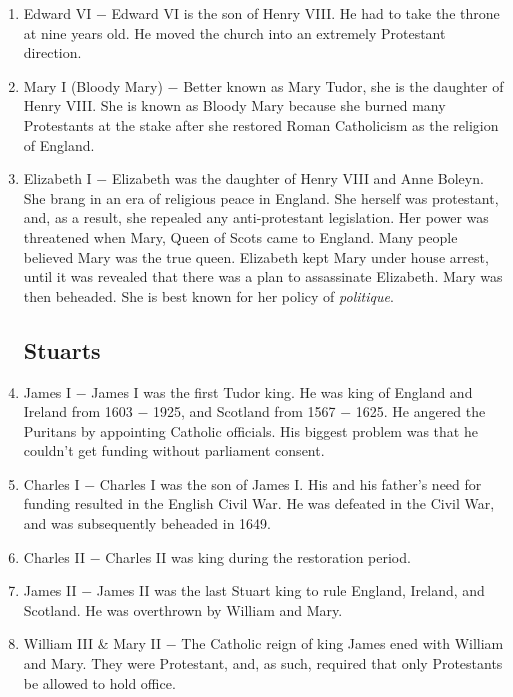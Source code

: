 \documentclass[12pt]{article}
\begin{document}
\begin{enumerate}
\item Edward VI $-$ Edward VI is the son of Henry VIII. He had to take the throne at nine years old. He moved the church into an extremely Protestant direction.

\item Mary I (Bloody Mary) $-$ Better known as Mary Tudor, she is the daughter of Henry VIII. She is known as Bloody Mary because she burned many Protestants at the stake after she restored Roman Catholicism as the religion of England.

\item Elizabeth I $-$ Elizabeth was the daughter of Henry VIII and Anne Boleyn. She brang in an era of religious peace in England. She herself was protestant, and, as a result, she repealed any anti-protestant legislation. Her power was threatened when Mary, Queen of Scots came to England. Many people believed Mary was the true queen. Elizabeth kept Mary under house arrest, until it was revealed that there was a plan to assassinate Elizabeth. Mary was then beheaded. She is best known for her policy of \textit{politique}.

\subsection{Stuarts}

\item James I $-$ James I was the first Tudor king. He was king of England and Ireland from 1603 $-$ 1925, and Scotland from 1567 $-$ 1625. He angered the Puritans by appointing Catholic officials. His biggest problem was that he couldn't get funding without parliament consent. 

\item Charles I $-$ Charles I was the son of James I. His and his father's need for funding resulted in the English Civil War. He was defeated in the Civil War, and was subsequently beheaded in 1649.

\item Charles II $-$ Charles II was king during the restoration period.

\item James II $-$ James II was the last Stuart king to rule England, Ireland, and Scotland. He was overthrown by William and Mary.

\item William III \& Mary II $-$ The Catholic reign of king James ened with William and Mary. They were Protestant, and, as such, required that only Protestants be allowed to hold office.


\end{enumerate}
\end{document}
